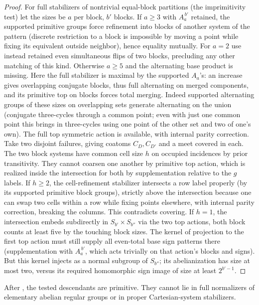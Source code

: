 \begin{proof}

For full stabilizers of nontrivial equal-block partitions (the imprimitivity test) let the sizes be \(a\)
per block, \(b'\) blocks. If \(a\ge3\) with \(A_a^{\,b'}\) retained, the supported primitive groups force
refinement into blocks of another system of the pattern (discrete restriction to a block is impossible by
moving a point while fixing its equivalent outside neighbor), hence equality mutually. For \(a=2\) use
instead retained even simultaneous flips of two blocks, precluding any other matching of this kind.
Otherwise \(a\ge5\) and the alternating base product is missing. Here the full stabilizer is maximal by
the supported \(A_a\)'s: an increase gives overlapping conjugate blocks, thus full alternating on merged
components, and its primitive top on blocks forces total merging. Indeed supported alternating groups of
these sizes on overlapping sets generate alternating on the union (conjugate three-cycles through a
common point; even with just one common point this brings in three-cycles using one point of the other
set and two of one's own). The full top symmetric action is available, with internal parity correction.
Take two disjoint failures, giving coatoms \(C_D,C_{D'}\) and a meet covered in each. The two block
systems have common cell size \(h\) on occupied incidences by prior transitivity. They cannot coarsen one
another by primitive top action, which is realized inside the intersection for both by supplementation
relative to the \(g\) labels. If \(h\ge2\), the cell-refinement stabilizer intersects a row label
properly (by its supported primitive block groups), strictly above the intersection because one can swap
two cells within a row while fixing points elsewhere, with internal parity correction, breaking the
columns. This contradicts covering. If \(h=1\), the intersection embeds subdirectly in \(S_{b'}\times
S_{b''}\) via the two top actions, both block counts at least five by the touching block sizes. The
kernel of projection to the first top action must still supply all even-total base sign patterns there
(supplementation with \(A_a^{\,b'}\), which acts trivially on that action's blocks and signs). But this
kernel injects as a normal subgroup of \(S_{b''}\); its abelianization has size at most two, versus its
required homomorphic sign image of size at least \(2^{b'-1}\).

\end{proof}

\begin{proposition}\label{fa:cartesian-exclusion}
After , the tested descendants are primitive.  They cannot lie in full
normalizers of elementary abelian regular groups or in proper Cartesian-system stabilizers.
\end{proposition}

